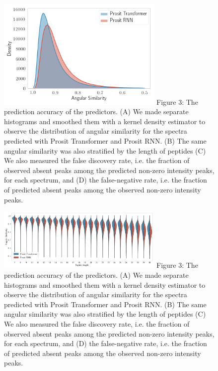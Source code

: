 \documentclass[10pt,a4paper]{article}
\begin{document}
\begin{figure}[htb]
\includegraphics[width=8cm]{./figures/spectralAngleDist.png}
Figure 3: The prediction accuracy of the predictors. (A) We made separate histograms and smoothed them with a kernel density estimator to observe the distribution of angular similarity for the spectra predicted with Prosit Transformer and Prosit RNN. (B) The same angular similarity was also stratified by the length of peptides (C) We also measured the false discovery rate, i.e. the fraction of observed absent peaks among the predicted non-zero intensity peaks, for each spectrum, and (D) the false-negative rate, i.e. the fraction of predicted absent peaks among the observed non-zero intensity peaks.
\end{figure}
\begin{figure}[htb]
\includegraphics[width=8cm]{./figures/violin_sa_pepLen.png}
Figure 3: The prediction accuracy of the predictors. (A) We made separate histograms and smoothed them with a kernel density estimator to observe the distribution of angular similarity for the spectra predicted with Prosit Transformer and Prosit RNN. (B) The same angular similarity was also stratified by the length of peptides (C) We also measured the false discovery rate, i.e. the fraction of observed absent peaks among the predicted non-zero intensity peaks, for each spectrum, and (D) the false-negative rate, i.e. the fraction of predicted absent peaks among the observed non-zero intensity peaks.
\end{figure}
\end{document}
